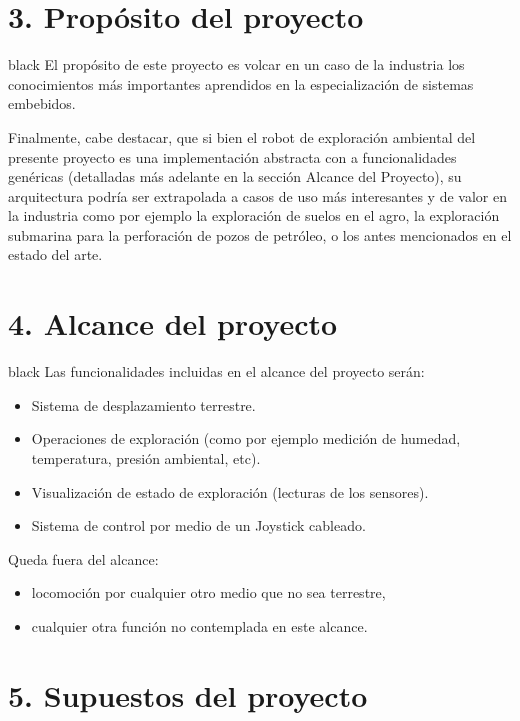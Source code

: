 \documentclass[
11pt, %
codirector, %
]{charter}
\begin{document}
\section{3. Propósito del proyecto}
\label{sec:proposito}

\begin{consigna}{black}
El propósito de este proyecto es volcar en un caso de la industria los conocimientos más importantes aprendidos en la especialización de sistemas embebidos.

Finalmente, cabe destacar, que si bien el robot de exploración ambiental del presente proyecto es una implementación abstracta con a funcionalidades genéricas (detalladas más adelante en la sección Alcance del Proyecto), su arquitectura podría ser extrapolada a casos de uso más interesantes y de valor en la industria como por ejemplo la exploración de suelos en el agro, la exploración submarina para la perforación de pozos de petróleo, o los antes mencionados en el estado del arte.

\end{consigna}

\section{4. Alcance del proyecto}
\label{sec:alcance}

\begin{consigna}{black}
Las funcionalidades incluidas en el alcance del proyecto serán:
\begin{itemize}
	\item Sistema de desplazamiento terrestre.
	\item Operaciones de exploración (como por ejemplo medición de humedad, temperatura, presión ambiental, etc).
	\item Visualización de estado de exploración (lecturas de los sensores).
	\item Sistema de control por medio de un Joystick cableado.
\end{itemize}

Queda fuera del alcance:
\begin{itemize}
	\item locomoción por cualquier otro medio que no sea terrestre,
	\item cualquier otra función no contemplada en este alcance.
\end{itemize}
\end{consigna}


\section{5. Supuestos del proyecto}
\label{sec:supuestos}
\end{document}
